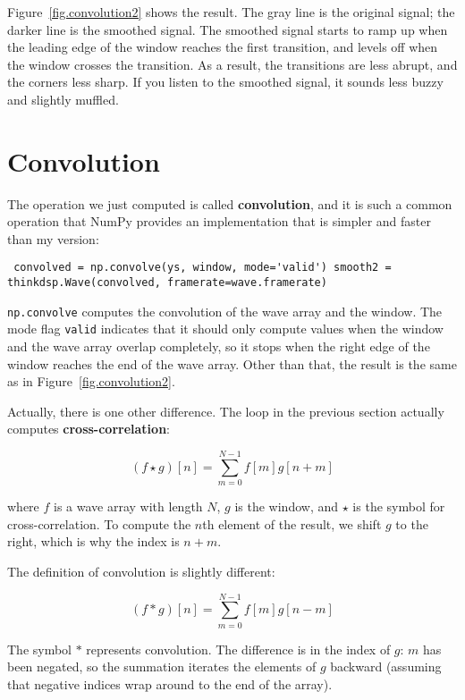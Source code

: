 \documentclass[12pt]{book} \usepackage[width=5.5in,height=8.5in, hmarginratio=3:2,vmarginratio=1:1]{geometry}
\begin{document}
Figure~\ref{fig.convolution2} shows the result. The gray line is the original signal; the darker line is the smoothed signal. The smoothed signal starts to ramp up when the leading edge of the window reaches the first transition, and levels off when the window crosses the transition. As a result, the transitions are less abrupt, and the corners less sharp. If you listen to the smoothed signal, it sounds less buzzy and slightly muffled. 

\section{Convolution} \label{convolution} 

The operation we just computed is called {\bf convolution}, and it is such a common operation that NumPy provides an implementation that is simpler and faster than my version: 

\begin{verbatim} convolved = np.convolve(ys, window, mode='valid') smooth2 = thinkdsp.Wave(convolved, framerate=wave.framerate) \end{verbatim} 

{\tt np.convolve} computes the convolution of the wave array and the window. The mode flag {\tt valid} indicates that it should only compute values when the window and the wave array overlap completely, so it stops when the right edge of the window reaches the end of the wave array. Other than that, the result is the same as in Figure~\ref{fig.convolution2}. 

\newcommand{\conv}{\ast} 

Actually, there is one other difference. The loop in the previous section actually computes {\bf cross-correlation}: 

%
\[ (f \star g)[n] = \sum_{m=0}^{N-1} f[m] g[n+m] \] 

%
where $f$ is a wave array with length $N$, $g$ is the window, and $\star$ is the symbol for cross-correlation. To compute the $n$th element of the result, we shift $g$ to the right, which is why the index is $n+m$. 

The definition of convolution is slightly different: 

%
\[ (f \conv g)[n] = \sum_{m=0}^{N-1} f[m] g[n-m] \] 

%
The symbol $\conv$ represents convolution. The difference is in the index of $g$: $m$ has been negated, so the summation iterates the elements of $g$ backward (assuming that negative indices wrap around to the end of the array). 
\end{document}

